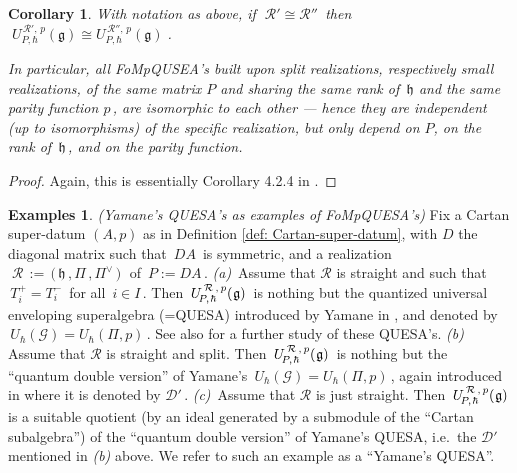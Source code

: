 \documentclass[12pt,reqno,twoside,a4paper]{amsart}
\numberwithin{equation}{section}
\newtheorem{cor}[lema]{Corollary}
\theoremstyle{definition}
\newtheorem{exas}[lema]{Examples}
\newtheorem{free text}[lema]{}
\theoremstyle{remark}
\newcommand{\R}{{\mathcal R}}
\def \lieg{\mathfrak{g}}
\def \lieh{\mathfrak{h}}
\def \uRpPhg{U^{\,\R\,,\,p}_{\!P,\hskip0,7pt\hbar}(\hskip0,5pt\lieg)}
\def \pf{\begin{proof}}
\def \epf{\end{proof}}
\theoremstyle{plain}
\begin{document}
\begin{cor}  \label{cor: isom_R -> isom_uRPhg}
%
 With notation as above, if  $ \; \R' \cong \R'' \, $  then  $ \; U^{\,\R'\!,\,p}_{P,\hbar}(\lieg) \cong U^{\,\R''\!,\,p}_{P,\hbar}(\lieg) \; $.
                                                     \par
   In particular, all FoMpQUSEA's built upon split realizations, respectively small realizations, of the same matrix  $ P $  and sharing the same rank of  $ \, \lieh $  and the same parity function  $ p \, $,  are isomorphic to each other   --- hence they are independent (up to isomorphisms)  of the specific realization, but only depend on
 $ P $,  on the rank of  $ \, \lieh \, $,  and on the parity function.
%
\end{cor}

\pf
%
 Again, this is essentially Corollary 4.2.4 in \cite{GG3}.
%
\epf

\vskip9pt

\begin{exas}  \label{example-Yamane's_FoQUEASA's}
%
 \textsl{(Yamane's QUESA's as examples of FoMpQUESA's)}
%
 \vskip3pt
%
   Fix a Cartan super-datum  $ (A,p) $  as in  Definition \ref{def: Cartan-super-datum},  with
   $ D $  the diagonal matrix such that  $ \, D A \, $  is symmetric, and a realization
   $ \; \R \, := \, \big(\, \lieh \, , \Pi \, , \Pi^\vee \,\big) \; $  of  $ \, P := D A \, $.
%
 \vskip3pt
%
   \textit{(a)}\,  Assume that  $ \R $  is straight and such that  $ \, T_i^+ = T_i^- \, $
   for all  $ \, i \in I \, $.  Then  $ \, \uRpPhg \, $  is nothing but the quantized universal enveloping superalgebra
   (=QUESA) introduced by Yamane in  \cite{Ya1},  and denoted by  $ \, U_\hbar(\mathcal{G}) = U_\hbar(\Pi,p) \, $.
   See also  \cite{Ge1}  for a further study of these QUESA's.
%
 \vskip5pt
%
   \textit{(b)}\,  Assume that  $ \R $  is straight and split.  Then  $ \, \uRpPhg \, $
   is nothing but the ``quantum double version'' of Yamane's  $ \, U_\hbar(\mathcal{G}) = U_\hbar(\Pi,p) \, $,
   again introduced in  \cite{Ya1}  where it is denoted by  $ \mathcal{D}' \, $.
%
 \vskip5pt
%
   \textit{(c)}\,  Assume that  $ \R $  is just straight.  Then  $ \, \uRpPhg \, $
   is a suitable quotient (by an ideal generated by a submodule of the ``Cartan subalgebra'') of
   the ``quantum double version'' of Yamane's QUESA, i.e.\ the  $ \mathcal{D}' $  mentioned in  \textit{(b)\/}  above.
   We refer to such an example as a ``Yamane's QUESA''.
%
\end{exas}
\end{document}
